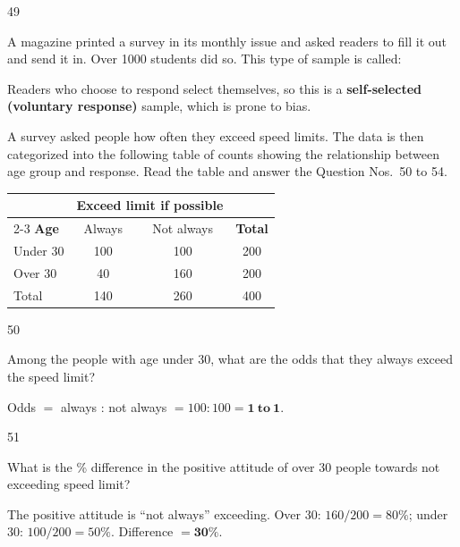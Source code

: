 \begin{question}{49}
{A magazine printed a survey in its monthly issue and asked readers to fill it out and send it in. Over 1000 students did so. This type of sample is called:\par}
\begin{explain}
Readers who choose to respond select themselves, so this is a \textbf{self-selected (voluntary response)} sample, which is prone to bias.
\end{explain}
\end{question}

\begin{context}
A survey asked people how often they exceed speed limits. The data is then categorized into the following table of counts showing the relationship between age group and response. Read the table and answer the Question Nos.~50 to 54.
\begin{center}
\begin{tabular}{lccc}\toprule
& \multicolumn{2}{c}{\textbf{Exceed limit if possible}} & \\\cmidrule(lr){2-3}
\textbf{Age} & Always & Not always & \textbf{Total}\\\midrule
Under 30 & 100 & 100 & 200\\ Over 30 & 40 & 160 & 200\\\midrule Total & 140 & 260 & 400\\\bottomrule
\end{tabular}
\end{center}
\end{context}
\begin{question}{50}
{Among the people with age under 30, what are the odds that they always exceed the speed limit?\par}
\begin{explain}
Odds $=$ always : not always $=100:100=\mathbf{1\ to\ 1}$.
\end{explain}
\end{question}

\begin{question}{51}
{What is the \% difference in the positive attitude of over 30 people towards not exceeding speed limit?\par}
\begin{explain}
The positive attitude is ``not always'' exceeding. Over 30: $160/200=80\%$; under 30: $100/200=50\%$. Difference $=\mathbf{30\%}$.
\end{explain}
\end{question}

